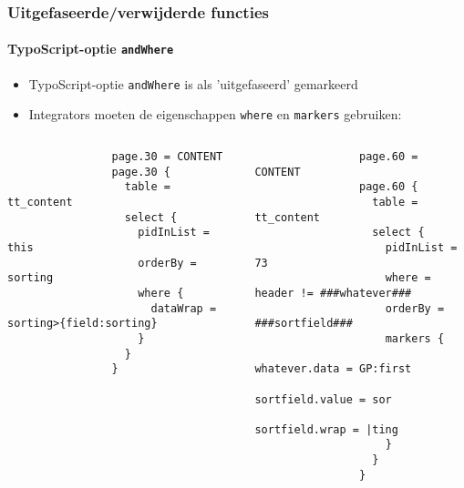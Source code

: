 \begin{frame}[fragile]
	\frametitle{Uitgefaseerde/verwijderde functies}
	\framesubtitle{TypoScript-optie \texttt{andWhere}}

	\lstset{basicstyle=\tiny\ttfamily}

	\begin{itemize}
		\item TypoScript-optie \texttt{andWhere} is als 'uitgefaseerd' gemarkeerd
		\item Integrators moeten de eigenschappen \texttt{where} en \texttt{markers} gebruiken:
	\end{itemize}

	\begin{columns}[T]
		\begin{column}{.6\textwidth}

			\lstset{xleftmargin=1cm}

			\begin{lstlisting}
				page.30 = CONTENT
				page.30 {
				  table = tt_content
				  select {
				    pidInList = this
				    orderBy = sorting
				    where {
				      dataWrap = sorting>{field:sorting}
				    }
				  }
				}
			\end{lstlisting}
		\end{column}
		\begin{column}{.4\textwidth}
			\begin{lstlisting}
				page.60 = CONTENT
				page.60 {
				  table = tt_content
				  select {
				    pidInList = 73
				    where = header != ###whatever###
				    orderBy = ###sortfield###
				    markers {
				      whatever.data = GP:first
				      sortfield.value = sor
				      sortfield.wrap = |ting
				    }
				  }
				}
			\end{lstlisting}
		\end{column}
	\end{columns}

\end{frame}


